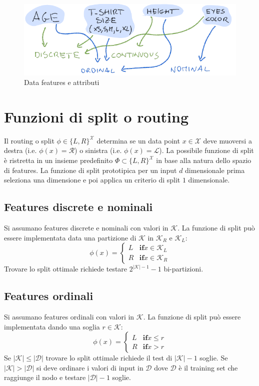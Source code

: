 \begin{figure}
	\centering
	\includegraphics[width=0.6\linewidth]{imgs/chapter5/img6}
	\caption{Data features e attributi}
	\label{fig:chapter05-06}
\end{figure}

\section{Funzioni di split o routing}
Il routing o split $\phi\in\{L,R\}^{\mathcal{X}}$ determina se un data point $x\in\mathcal{X}$ deve muoversi a destra (i.e. $\phi(x)=\mathcal{R}$) o sinistra (i.e. $\phi(x)=\mathcal{L}$).
La possibile funzione di split \`e ristretta in un insieme predefinito $\Phi\subset\{L,R\}^\mathcal{X}$ in base alla natura dello spazio di features.
La funzione di split prototipica per un input $d$ dimensionale prima seleziona una dimensione e poi applica un criterio di split $1$ dimensionale.

	\subsection{Features discrete e nominali}
	Si assumano features discrete e nominali con valori in $\mathcal{K}$.
	La funzione di split pu\`o essere implementata data una partizione di $\mathcal{K}$ in $\mathcal{K}_R$ e $\mathcal{K}_L$:
	$$\phi(x) = \begin{cases}L &\mathbf{if} x\in\mathcal{K}_L\\
		 								  R &\mathbf{if} x\in\mathcal{K}_R
				 \end{cases}$$
	Trovare lo split ottimale richiede testare $2^{|\mathcal{K}|-1}-1$ bi-partizioni.

	\subsection{Features ordinali}
	Si assumano features ordinali con valori in $\mathcal{K}$.
	La funzione di split pu\`o essere implementata dando una soglia $r\in\mathcal{K}$:
	$$\phi(x) = \begin{cases}L &\mathbf{if} x\le r\\
		 								  R &\mathbf{if} x>r
				 \end{cases}$$
	Se $|\mathcal{K}|\le|\mathcal{D}|$ trovare lo split ottimale richiede il test di $|\mathcal{K}|-1$ soglie.
	Se $|\mathcal{K}|>|\mathcal{D}|$ si deve ordinare i valori di input in $\mathcal{D}$ dove $\mathcal{D}$ \`e il training set che raggiunge il nodo e testare $|\mathcal{D}|-1$ soglie.

